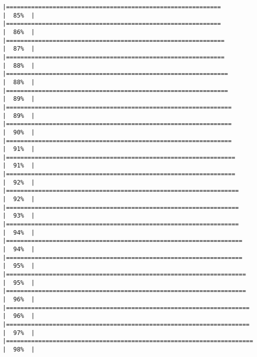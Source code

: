 \documentclass[
]{article}
\begin{document}
\begin{verbatim}
|============================================================          |  85%  |                                                                              |============================================================          |  86%  |                                                                              |=============================================================         |  87%  |                                                                              |=============================================================         |  88%  |                                                                              |==============================================================        |  88%  |                                                                              |==============================================================        |  89%  |                                                                              |===============================================================       |  89%  |                                                                              |===============================================================       |  90%  |                                                                              |===============================================================       |  91%  |                                                                              |================================================================      |  91%  |                                                                              |================================================================      |  92%  |                                                                              |=================================================================     |  92%  |                                                                              |=================================================================     |  93%  |                                                                              |=================================================================     |  94%  |                                                                              |==================================================================    |  94%  |                                                                              |==================================================================    |  95%  |                                                                              |===================================================================   |  95%  |                                                                              |===================================================================   |  96%  |                                                                              |====================================================================  |  96%  |                                                                              |====================================================================  |  97%  |                                                                              |===================================================================== |  98%  |                                                                              
\end{verbatim}
\end{document}
